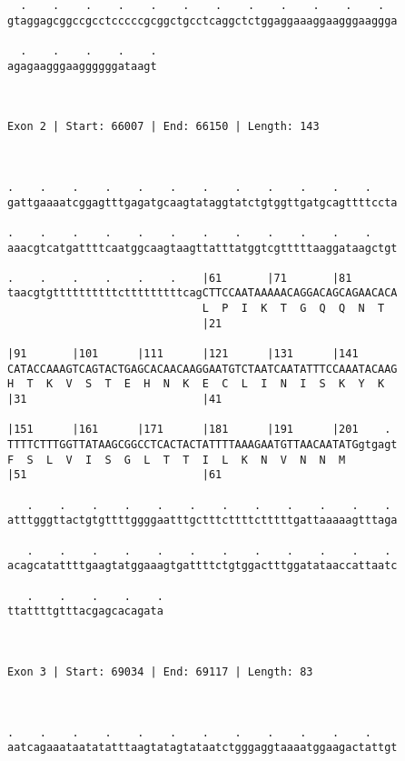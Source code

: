 \documentclass{article}
\begin{document}
\begin{Verbatim}
  .    .    .    .    .    .    .    .    .    .    .    .  
gtaggagcggccgcctcccccgcggctgcctcaggctctggaggaaaggaagggaaggga
                                                            
  .    .    .    .    .
agagaagggaaggggggataagt
                       
                       
 
Exon 2 | Start: 66007 | End: 66150 | Length: 143



.    .    .    .    .    .    .    .    .    .    .    .    
gattgaaaatcggagtttgagatgcaagtataggtatctgtggttgatgcagttttccta
                                                            
.    .    .    .    .    .    .    .    .    .    .    .    
aaacgtcatgattttcaatggcaagtaagttatttatggtcgtttttaaggataagctgt
                                                            
.    .    .    .    .    .    |61       |71       |81       
taacgtgttttttttttctttttttttcagCTTCCAATAAAAACAGGACAGCAGAACACA
                              L  P  I  K  T  G  Q  Q  N  T  
                              |21                           
  
|91       |101      |111      |121      |131      |141      
CATACCAAAGTCAGTACTGAGCACAACAAGGAATGTCTAATCAATATTTCCAAATACAAG
H  T  K  V  S  T  E  H  N  K  E  C  L  I  N  I  S  K  Y  K  
|31                           |41                           
  
|151      |161      |171      |181      |191      |201    . 
TTTTCTTTGGTTATAAGCGGCCTCACTACTATTTTAAAGAATGTTAACAATATGgtgagt
F  S  L  V  I  S  G  L  T  T  I  L  K  N  V  N  N  M        
|51                           |61                           
  
   .    .    .    .    .    .    .    .    .    .    .    . 
atttgggttactgtgttttggggaatttgctttcttttctttttgattaaaaagtttaga
                                                            
   .    .    .    .    .    .    .    .    .    .    .    . 
acagcatattttgaagtatggaaagtgattttctgtggactttggatataaccattaatc
                                                            
   .    .    .    .    .
ttattttgtttacgagcacagata
                        
                        
 
Exon 3 | Start: 69034 | End: 69117 | Length: 83



.    .    .    .    .    .    .    .    .    .    .    .    
aatcagaaataatatatttaagtatagtataatctgggaggtaaaatggaagactattgt
                                                            

\end{Verbatim}
\end{document}
